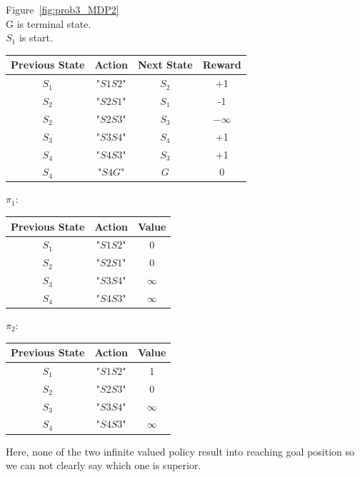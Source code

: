 \documentclass[12pt]{article}
\begin{document}
\begin{itemize}
\begin{solution}
Figure~\ref{fig:prob3_MDP2}\\
G is terminal state. \\
$S_1$ is start. \\
\begin{center}
  \begin{tabular}{|c|c|c|c|}\hline
    {\bf Previous State} & {\bf Action} & {\bf Next State} & {\bf Reward} \\ \hline
    $S_1$ & "$S1S2$" & $S_2$ & +1 \\ \hline
    $S_2$ & "$S2S1$" & $S_1$ & -1 \\ \hline
    $S_2$ & "$S2S3$" & $S_3$ & $-\infty$\\ \hline
    $S_3$ & "$S3S4$" & $S_4$ & +1\\ \hline
    $S_4$ & "$S4S3$" & $S_3$ & +1\\ \hline
    $S_4$ & "$S4G$" & $G$ & 0\\ \hline
  \end{tabular}
\end{center}
$\pi_1:$
\begin{center}
  \begin{tabular}{|c|c|c|}\hline
    {\bf Previous State} & {\bf Action} & {\bf Value} \\ \hline
    $S_1$ & "$S1S2$" & 0 \\ \hline
    $S_2$ & "$S2S1$" & 0 \\ \hline
    $S_3$ & "$S3S4$" & $\infty$ \\ \hline
    $S_4$ & "$S4S3$" & $\infty$\\ \hline
  \end{tabular}
\end{center}

$\pi_2:$
\begin{center}
  \begin{tabular}{|c|c|c|}\hline
    {\bf Previous State} & {\bf Action} & {\bf Value} \\ \hline
    $S_1$ & "$S1S2$" & 1 \\ \hline
    $S_2$ & "$S2S3$" & 0 \\ \hline
    $S_3$ & "$S3S4$" & $\infty$ \\ \hline
    $S_4$ & "$S4S3$" & $\infty$ \\ \hline
  \end{tabular}
\end{center}

Here, none of the two infinite valued policy result into reaching goal position so we can not clearly say which one is superior.
\end{solution}


\end{itemize}
\end{document}
